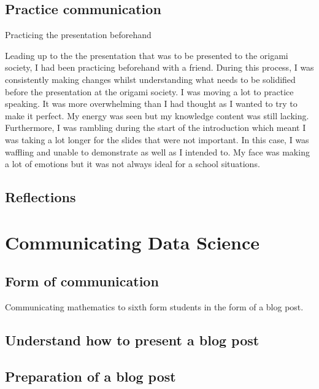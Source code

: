 \documentclass[12pt, a4paper,oneside]{book}
\numberwithin{equation}{section}
\begin{document}
\section{Practice communication}\label{sec:x.x}

Practicing the presentation beforehand

Leading up to the the presentation that was to be presented to the origami society, I had been practicing beforehand with a friend. During this process, I was consistently making changes whilst understanding what needs to be solidified before the presentation at the origami society. I was moving a lot to practice speaking. It was more overwhelming than I had thought as I wanted to try to make it perfect. My energy was seen but my knowledge content was still lacking. Furthermore, I was rambling during the start of the introduction which meant I was taking a lot longer for the slides that were not important. In this case, I was waffling and unable to demonstrate as well as I intended to. My face was making a lot of emotions but it was not always ideal for a school situations.

\section{Reflections}\label{sec:x.x}

\chapter{Communicating Data Science}\label{ch:x}


\section{Form of communication}\label{sec:x.x}

Communicating mathematics to sixth form students in the form of a blog post.

\section{Understand how to present a blog post}\label{sec:x.x}


\section{Preparation of a blog post}\label{sec:x.x}
\end{document}
